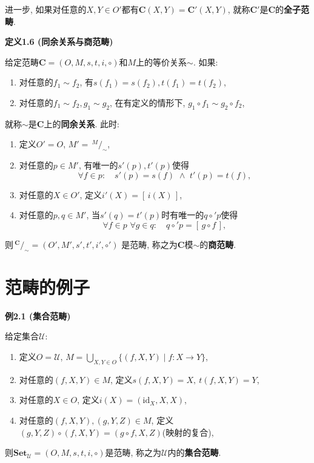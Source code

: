 \documentclass[UTF8]{ctexart}
\begin{document}
进一步, 如果对任意的$X,Y\in O'$都有$\mathbf{C}(X,Y)=\mathbf{C}'(X,Y)$,
就称$\mathbf{C}'$是$\mathbf{C}$的\textbf{全子范畴}.

\vspace{10pt}

\hypertarget{sec:定义1.6}{}
\noindent\textbf{定义1.6 (同余关系与商范畴)}

给定范畴$\mathbf{C}=(O,M,s,t,i,\circ)$和$M$上的等价关系$\sim$. 如果:
\begin{enumerate}
    \item 对任意的$f_1\sim f_2$, 有$s(f_1)=s(f_2),t(f_1)=t(f_2)$,
    \item 对任意的$f_1\sim f_2,g_1\sim g_2$, 在有定义的情形下,
    $g_1\circ f_1\sim g_2\circ f_2$,
\end{enumerate}
就称$\sim$是$\mathbf{C}$上的\textbf{同余关系}. 此时:
\begin{enumerate}
    \vspace{3pt}
    \item 定义$O'=O$, $M'=\,\!^{\displaystyle M}\!/_{\displaystyle\sim}$,
    \item 对任意的$p\in M'$, 有唯一的$s'(p),t'(p)$使得
    \[
        \forall f\in p:\quad s'(p)=s(f)\,\,\land\,\,t'(p)=t(f),
    \]
    \item 对任意的$X\in O'$, 定义$i'(X)=[\,i(X)\,]$,
    \item 对任意的$p,q\in M'$, 当$s'(q)=t'(p)$时有唯一的$q\circ'p$使得
    \[
        \forall f\in p\,\,\forall g\in q:\quad q\circ'p=[\,g\circ f\,],
    \]
\end{enumerate}
则$\,\!^{\displaystyle\mathbf{C}}\!/_{\displaystyle\sim}=(O',M',s',t',i',\circ')$
是范畴, 称之为$\mathbf{C}$模$\sim$的\textbf{商范畴}.





\newpage

\section{范畴的例子}

\hypertarget{sec:例2.1}{}
\noindent\textbf{例2.1 (集合范畴)}

给定集合$\mathcal{U}$:
\begin{enumerate}
    \item 定义$O=\mathcal{U}$,
    $\displaystyle M=\bigcup_{X,Y\in O}\{(f,X,Y)\mid f:X\to Y\}$,
    \vspace{3pt}
    \item 对任意的$(f,X,Y)\in M$, 定义$s(f,X,Y)=X,\ t(f,X,Y)=Y$,
    \item 对任意的$X\in O$, 定义$i(X)=(\mathrm{id}_X,X,X)$,
    \item 对任意的$(f,X,Y),(g,Y,Z)\in M$,
    定义$(g,Y,Z)\circ(f,X,Y)=(g\circ f,X,Z)$(映射的复合),
\end{enumerate}
则$\mathbf{Set}_{\mathcal{U}}=(O,M,s,t,i,\circ)$是范畴,
称之为$\mathcal{U}$内的\textbf{集合范畴}.
\end{document}

